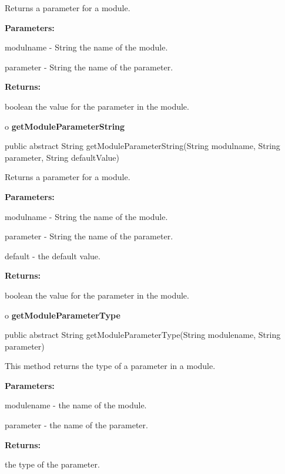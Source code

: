 \begin{description}
\htmlDD Returns a parameter for a module. 

\begin{description}
\item {\bf Parameters:}  

modulname - String the name of the module.  

parameter - String the name of the parameter.  
\item {\bf Returns:}  

boolean the value for the parameter in the module.  
\end{description}

\end{description}

o {\bf getModuleParameterString} 

\begin{PRE}
 public abstract String getModuleParameterString(String modulname,
                                                 String parameter,
                                                 String defaultValue)
\end{PRE}

\begin{description}
\htmlDD Returns a parameter for a module. 

\begin{description}
\item {\bf Parameters:}  

modulname - String the name of the module.  

parameter - String the name of the parameter.  

default - the default value.  
\item {\bf Returns:}  

boolean the value for the parameter in the module.  
\end{description}

\end{description}

o {\bf getModuleParameterType} 

\begin{PRE}
 public abstract String getModuleParameterType(String modulename,
                                               String parameter)
\end{PRE}

\begin{description}
\htmlDD This method returns the type of a parameter in a module. 

\begin{description}
\item {\bf Parameters:}  

modulename - the name of the module.  

parameter - the name of the parameter.  
\item {\bf Returns:}  

the type of the parameter.  
\end{description}

\end{description}

